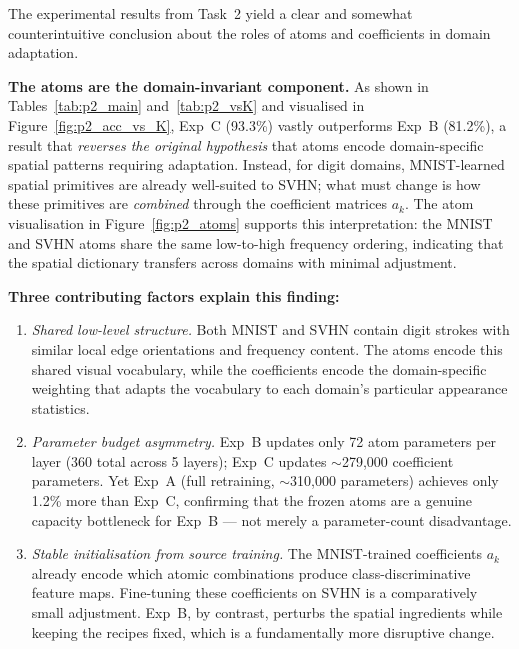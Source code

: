 \documentclass[11pt,letterpaper]{article}
\begin{document}
The experimental results from Task~2 yield a clear and somewhat
counterintuitive conclusion about the roles of atoms and coefficients in
domain adaptation.

\textbf{The atoms are the domain-invariant component.}
As shown in Tables~\ref{tab:p2_main} and~\ref{tab:p2_vsK} and visualised
in Figure~\ref{fig:p2_acc_vs_K}, Exp~C (93.3\%) vastly outperforms Exp~B
(81.2\%), a result that \emph{reverses the original hypothesis} that atoms
encode domain-specific spatial patterns requiring adaptation.
Instead, for digit domains, MNIST-learned spatial primitives are already
well-suited to SVHN; what must change is how these primitives are
\emph{combined} through the coefficient matrices $a_k$.  The atom
visualisation in Figure~\ref{fig:p2_atoms} supports this interpretation:
the MNIST and SVHN atoms share the same low-to-high frequency ordering,
indicating that the spatial dictionary transfers across domains with
minimal adjustment.

\textbf{Three contributing factors explain this finding:}
\begin{enumerate}[leftmargin=*]
  \item \emph{Shared low-level structure.}  Both MNIST and SVHN contain
        digit strokes with similar local edge orientations and frequency
        content.  The atoms encode this shared visual vocabulary, while the
        coefficients encode the domain-specific weighting that adapts the
        vocabulary to each domain's particular appearance statistics.

  \item \emph{Parameter budget asymmetry.}  Exp~B updates only 72 atom
        parameters per layer (360 total across 5 layers); Exp~C updates
        $\sim$279{,}000 coefficient parameters.  Yet Exp~A (full
        retraining, $\sim$310{,}000 parameters) achieves only 1.2\% more
        than Exp~C, confirming that the frozen atoms are a genuine capacity
        bottleneck for Exp~B --- not merely a parameter-count disadvantage.

  \item \emph{Stable initialisation from source training.}  The
        MNIST-trained coefficients $a_k$ already encode which atomic
        combinations produce class-discriminative feature maps.
        Fine-tuning these coefficients on SVHN is a comparatively small
        adjustment.  Exp~B, by contrast, perturbs the spatial ingredients
        while keeping the recipes fixed, which is a fundamentally more
        disruptive change.
\end{enumerate}
\end{document}
